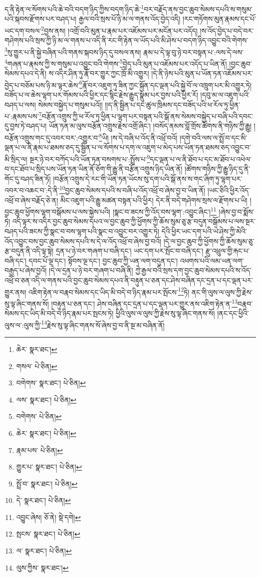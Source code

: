 ད་ནི་རྟེན་ལ་སོགས་པའི་ཆེ་བའི་བདག་ཉིད་ཀྱིས་བདག་ཉིད་ཆེ་\footnote{ཆེར་  སྣར་ཐང་། }བར་བརྗོད་ནས་བྱང་ཆུབ་སེམས་དཔའི་ས་གསུམ་པའི་སྐབས་རྫོགས་པར་བཤད་པ། རྒྱལ་བའི་སྲས་པོ་ཉི་མ་ལ་གནས་འོད་བྱེད་འདི། །རང་གཏོགས་མུན་རྣམས་དང་པོ་ཡང་དག་བསལ་\footnote{གསལ་  པེ་ཅིན། }བྱས་ནས། །འགྲོ་བའི་མུན་པ་རྣམ་པར་འཇོམས་པར་མངོན་པར་འདོད། །ས་འོད་བྱེད་པ་བདེ་བར་གཤེགས་པའི་སྲས་ཀྱི་ཉི་མ་ལ་གནས་པ་འདི་ནི་རང་གི་རྟེན་ལ་ཡོད་པའི་མི་ཤེས་པ་བདག་ཉིད་འབྱུང་བའི་གེགས་\footnote{བགེགས་  སྣར་ཐང་།  པེ་ཅིན། }སུ་གྱུར་པ་ནི་སྐྱེ་བཞིན་པའི་གནས་སྐབས་ཉིད་དུ་བསལ་ནས། རྣམ་པ་དེ་ལྟ་བུ་ཉེ་བར་བསྟན་པ་:ལས་དེ་ལས་\footnote{ལས་  སྣར་ཐང་།  པེ་ཅིན། }གཞན་པ་རྣམས་ཀྱི་ས་གསུམ་པ་འབྱུང་བའི་གེགས་\footnote{བགེགས་  པེ་ཅིན། }བྱེད་པའི་མུན་པ་འཇོམས་པར་འདོད་པ་ཡིན་ནོ། །བྱང་ཆུབ་སེམས་དཔའ་དེ་ནི། ས་འདིར་ཤིན་ཏུ་རྣོ་བར་གྱུར་ཀྱང་ཁྲོ་མི་འགྱུར། །དེ་ནི་ཉེས་པའི་མུན་པ་ཡོན་ཏན་འཇོམས་པར་བྱེད་པ་བཅོམ་པས་ཉི་མ་ལྟར་ཆེས་\footnote{ཆེར་  སྣར་ཐང་།  པེ་ཅིན། }རྣོ་བར་འཇུག་ཏུ་ཟིན་ཀྱང་སྐྱོན་དང་ལྡན་པའི་སྐྱེ་བོ་ལ་འཁྲུག་པར་མི་འགྱུར་ཏེ། བཟོད་པ་ལ་ཆེས་ལྷག་པར་གོམས་པའི་ཕྱིར་དང་སྙིང་རྗེས་རྒྱུད་སྣུམ་པར་བྱས་པའི་ཕྱིར་རོ། །དབུ་མ་ལ་འཇུག་པའི་བཤད་པ་ལས། སེམས་བསྐྱེད་པ་གསུམ་པའོ།། །།ད་ནི་སྦྱིན་པ་དང་ཚུལ་ཁྲིམས་དང་བཟོད་པའི་ཕ་རོལ་ཏུ་ཕྱིན་པ་:རྣམས་པས་\footnote{རྣམ་པས་  པེ་ཅིན། }བརྩོན་འགྲུས་ཀྱི་ཕ་རོལ་ཏུ་ཕྱིན་པ་ལྷག་པར་བསྟན་པའི་སྒོ་ནས་སེམས་བསྐྱེད་པ་བཞི་པའི་དབང་དུ་བྱས་ཏེ་བཤད་པ། ཡོན་ཏན་མ་ལུས་བརྩོན་འགྲུས་རྗེས་འགྲོ་ཞིང་། །བསོད་ནམས་བློ་གྲོས་ཚོགས་ནི་གཉིས་ཀྱི་རྒྱུ། །བརྩོན་འགྲུས་གང་དུ་འབར་བར་:འགྱུར་བ་\footnote{གྱུར་པ་  སྣར་ཐང་།  པེ་ཅིན། }ཡི། །ས་དེ་བཞི་པ་འོད་ནི་འཕྲོ་བའོ། །དགེ་བའི་ལས་ལ་སྤྲོ་བ་དང་མི་ལྡན་པ་ལ་ནི་རྣམ་པ་ཐམས་ཅད་དུ་སྦྱིན་པ་ལ་སོགས་པ་དག་ལ་འཇུག་པ་མེད་པས་ཡོན་ཏན་ཐམས་ཅད་འབྱུང་བ་མི་སྲིད་ལ། སྔར་ཉེ་བར་བཀོད་པའི་ཡོན་ཏན་བསགས་པ་:སྤྲོས་པ་\footnote{སྤྲོ་བ་  སྣར་ཐང་།  པེ་ཅིན། }དང་ལྡན་པ་ལ་ནི་ཐོབ་པ་དང་མ་ཐོབ་པ་འཕེལ་བ་དང་ཐོབ་པ་སྲིད་པས་ཡོན་ཏན་ཡིན་ནོ་ཅོག་གི་རྒྱུ་ནི་བརྩོན་འགྲུས་ཉིད་ཡིན་ནོ། །ཚོགས་གཉིས་ཀྱི་རྒྱུ་ཉིད་དུ་ནི་གོང་དུ་བཤད་ཟིན་ཏོ། །བརྩོན་འགྲུས་དེ་རང་གི་ཡོན་ཏན་ཡོངས་སུ་དག་པའི་སྒོ་ནས་ས་གང་ཞིག་ཏུ་ལྷག་པར་འབར་བ་འཆང་བ་:དེ་ནི་\footnote{དེ་  སྣར་ཐང་།  པེ་ཅིན། }བྱང་ཆུབ་སེམས་དཔའི་ས་བཞི་པ་འོད་འཕྲོ་བ་ཞེས་བྱ་བ་ཡིན་ནོ། །ཡང་ཅིའི་ཕྱིར་འོད་འཕྲོ་བ་ཞེས་བརྗོད་ཅེ་ན། མིང་འཇུག་པའི་རྒྱུ་མཚན་བསྟན་པའི་ཕྱིར། དེར་ནི་བདེ་གཤེགས་སྲས་ལ་རྫོགས་པ་ཡི། །བྱང་ཆུབ་ཕྱོགས་ལྷག་བསྒོམས་པ་ལས་སྐྱེས་པའི། །སྣང་བ་ཟངས་ཀྱི་འོད་བས་ལྷག་:འབྱུང་ཞིང་།\footnote{འབྱུང་ཞེས།  ཅོ་ནེ།  སྡེ་དགེ། } །ཞེས་བྱ་བ་སྨོས་ཏེ། འདི་ལྟར་ས་འདིར་བྱང་ཆུབ་སེམས་དཔའ་ལ་བྱང་ཆུབ་ཀྱི་ཕྱོགས་ཀྱི་ཆོས་སུམ་ཅུ་རྩ་བདུན་བསྒོམས་པ་ལས་སྔར་བཤད་པའི་ཟངས་ཀྱི་སྣང་བ་བས་ལྷག་པའི་སྣང་བ་འབྱུང་བར་འགྱུར་ཏེ། དེའི་ཕྱིར་ཡང་དག་པའི་ཡེ་ཤེས་ཀྱི་མེའི་འོད་འབྱུང་བས་བྱང་ཆུབ་སེམས་དཔའི་ས་དེ་ལ་འོད་འཕྲོ་བ་ཞེས་བྱ་བའོ། །དེ་ལ་བྱང་ཆུབ་ཀྱི་ཕྱོགས་ཀྱི་ཆོས་སུམ་ཅུ་རྩ་བདུན་ནི་འདི་ལྟ་སྟེ། དྲན་པ་ཉེ་བར་གཞག་པ་བཞི་དང་། ཡང་དག་པར་སྤོང་བ་བཞི་དང་། རྫུ་འཕྲུལ་གྱི་རྐང་པ་བཞི་དང་། དབང་པོ་ལྔ་དང་། སྟོབས་ལྔ་དང་། བྱང་ཆུབ་ཀྱི་ཡན་ལག་བདུན་དང་། འཕགས་པའི་ལམ་ཡན་ལག་བརྒྱད་པ་ཞེས་བྱའོ། །དེ་ལ་དྲན་པ་ཉེ་བར་གཞག་པ་བཞི་ནི། ཀྱེ་རྒྱལ་བའི་སྲས་དག་བྱང་ཆུབ་སེམས་དཔའི་ས་འོད་འཕྲོ་བ་ཅན་འདི་ལ་གནས་པའི་བྱང་ཆུབ་སེམས་དཔའ་ནི་བརྟུན་པ་ཅན་དང་ཤེས་བཞིན་དང་དྲན་པ་དང་ལྡན་པར་གྱུར་ནས། འཇིག་རྟེན་ལ་བརྣབ་སེམས་དང་ཡིད་མི་བདེ་བ་ཉིད་རྣམ་པར་སྤོངས་\footnote{སྤངས་  སྣར་ཐང་།  པེ་ཅིན། }ཏེ། ནང་གི་ལུས་ལ་ལུས་ཀྱི་རྗེས་སུ་ལྟ་ཞིང་གནས་སོ། །བརྟུན་པ་ཅན་དང་། ཤེས་བཞིན་དང་དྲན་པ་དང་ལྡན་པར་གྱུར་ནས་འཇིག་རྟེན་ན་\footnote{ལ་  སྣར་ཐང་།  པེ་ཅིན། }བརྣབ་སེམས་དང་ཡིད་མི་བདེ་བ་ཉིད་རྣམ་པར་སྤངས་ཏེ། ཕྱིའི་ལུས་ལ་ལུས་ཀྱི་རྗེས་སུ་ལྟ་ཞིང་གནས་སོ། །ནང་དང་ཕྱིའི་ལུས་ལ་:ལུས་ཀྱི་\footnote{ལུས་ཀྱིས་  སྣར་ཐང་། }རྗེས་སུ་ལྟ་ཞིང་གནས་སོ་ཞེས་བྱ་བ་ནི་སྔ་མ་བཞིན་ནོ། 